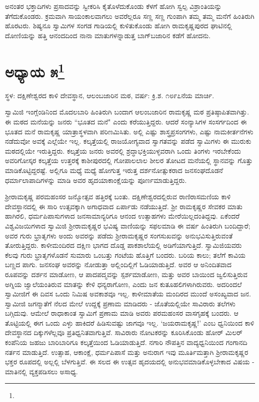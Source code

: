 ಅನಂತರ ಭಕ್ತಾದಿಗಳು ಪ್ರಸಾದವನ್ನು ಸ್ವೀಕರಿಸಿ ಕೈತೊಳೆದುಕೊಂಡು ಕೆಳಗೆ ಹೋಗಿ ಸ್ವಲ್ಪ ವಿಶ್ರಾಂತಿಯನ್ನು ತೆಗೆದುಕೊಂಡರು. ಕ್ರಮವಾಗಿ ಸಾಯಂಕಾಲವಾಗಲು ಅವರೆಲ್ಲರೂ ಸಣ್ಣ ಸಣ್ಣ ಗುಂಪಾಗಿ ತಮ್ಮ ತಮ್ಮ ಮನೆಗೆ ಹಿಂತಿರುಗಿ ಹೊರಟರು. ಶಿಷ್ಯನೂ ಸ್ವಾಮಿಗಳ ಸಂಗಡ ಗಾಡಿಯಲ್ಲಿ ಕುಳಿತುಕೊಂಡು ಹೋಗಿ ರಾಮಕೃಷ್ಣಪುರದ ಘಾಟಿನಲ್ಲಿ ದೋಣಿಯನ್ನು ಹತ್ತಿ ಆನಂದದಿಂದ ನಾನಾ ಮಾತುಗಳನ್ನಾಡುತ್ತ ಬಾಗ್‌ಬಜಾರಿನ ಕಡೆಗೆ ಹೋದನು.

\newpage

\chapter[ಅಧ್ಯಾಯ ೫]{ಅಧ್ಯಾಯ ೫\protect\footnote{}}

\centerline{ಸ್ಥಳ: ದಕ್ಷಿಣೇಶ್ವರದ ಕಾಳಿ ದೇವಸ್ಥಾನ, ಆಲಂಬಜಾರಿನ ಮಠ, ವರ್ಷ: ಕ್ರಿ.ಶ. ೧೮೯೭ನೆಯ ಮಾರ್ಚಿ.}

ಸ್ವಾಮಿಜಿ ಇಂಗ್ಲೆಂಡಿನಿಂದ ಮೊದಲಬಾರಿ ಹಿಂತಿರುಗಿ ಬಂದಾಗ ಆಲಂಬಜಾರಿನ ರಾಮಕೃಷ್ಣ ಮಠ ಪ್ರತಿಷ್ಠಾಪಿತವಾಗಿತ್ತು. ಈ ಮಠದ ಮನೆಯನ್ನು ಜನರು “ಭೂತದ ಮನೆ" ಎಂದು ಕರೆಯುತ್ತಿದ್ದರು. ಆದರೆ ಸಂನ್ಯಾಸಿಗಳ ಸಂಸರ್ಗದಿಂದ ಈ ಭೂತದ ಮನೆ ರಾಮಕೃಷ್ಣ ಯಾತ್ರಾಸ್ಥಳವಾಗಿ ಪರಿಣಮಿಸಿತು. ಅಲ್ಲಿ ಎಷ್ಟು ಶಾಸ್ತ್ರಪ್ರಸಂಗಗಳು, ಎಷ್ಟು ನಾಮಕೀರ್ತನೆಗಳು ನಡೆದುವೋ ಅವಕ್ಕೆ ಎಲ್ಲೆಯೇ ಇಲ್ಲ. ಕಲ್ಕತ್ತೆಯಲ್ಲಿ ರಾಜಯೋಗ್ಯವಾದ ಸ್ವಾಗತವನ್ನು ಪಡೆದ ಸ್ವಾಮಿಗಳು ಈ ಮುರುಕು ಮಠದಲ್ಲಿಯೇ ಇರುತ್ತಿದ್ದರು. ಕಲ್ಕತ್ತೆಯ ಜನರು ಅವರಲ್ಲಿ ಶ್ರದ್ಧಾಭಕ್ತಿಯುಳ್ಳವರಾಗಿ ಒಂದು ತಿಂಗಳು ಇರಬೇಕೆಂದು ಅವರಿಗೋಸ್ಕರ ಕಲ್ಕತ್ತೆಯ ಉತ್ತರಕ್ಕೆ ಕಾಶೀಪುರದಲ್ಲಿ ಗೋಪಾಲಲಾಲ ಶೀಲರ ತೋಟದ ಮನೆಯಲ್ಲಿ ಸ್ಥಾನವನ್ನು ಗೊತ್ತು ಮಾಡಿಕೊಟ್ಟಿದ್ದರಷ್ಟೆ. ಅಲ್ಲಿಗೂ ಮಧ್ಯೆ ಮಧ್ಯೆ ಹೋಗುತ್ತ ಇರುತ್ತ ದರ್ಶನೋತ್ಸುಕರಾದ ಜನಸಂಘದೊಡನೆ ಧರ್ಮಾಲಾಪಾದಿಗಳನ್ನು ಮಾಡಿ ಅವರ ಹೃದಯಾಕಾಂಕ್ಷೆಯನ್ನು ಪೂರ್ಣಮಾಡುತ್ತಿದ್ದರು.

ಶ‍್ರೀರಾಮಕೃಷ್ಣ ಪರಮಹಂಸರ ಜನ್ಮೋತ್ಸವ ಹತ್ತಿರಕ್ಕೆ ಬಂತು. ದಕ್ಷಿಣೇಶ್ವರದಲ್ಲಿರುವ ರಾಣಿರಾಸಮಣಿಯ ಕಾಳಿ ದೇವಸ್ಥಾನದಲ್ಲಿ ಈ ಸಾರಿ ಉತ್ಸವಕ್ಕಾಗಿ ಅಗಾಧವಾದ ಏರ್ಪಾಡು ನಡೆಯುತ್ತಿದೆ. ಶ‍್ರೀ ರಾಮಕೃಷ್ಣರ ಸೇವಕರ ಮಾತು ಹಾಗಿರಲಿ, ಧರ್ಮಪಿಪಾಸುಗಳಾದ ಜನಸಾಮಾನ್ಯರಿಗೂ ಆನಂದ ಉತ್ಸಾಹಗಳು ಮೇರೆಯಿಲ್ಲದಂತಿದ್ದವು. ಏಕೆಂದರೆ ವಿಶ್ವವಿಜಯಿಗಳಾದ ಸ್ವಾಮಿಜಿ ಶ‍್ರೀರಾಮಕೃಷ್ಣರ ಭವಿಷ್ಯ ವಾಣಿಯನ್ನು ಸಫಲಮಾಡಿ ಈ ವರ್ಷ ಹಿಂತಿರುಗಿ ಬಂದಿದ್ದಾರೆ; ಅವರ ಗುರು ಭ್ರಾತೃಗಳು ಅಂದು ಅವರನ್ನು ಪಡೆದು ಶ‍್ರೀರಾಮಕೃಷ್ಣರ ಸಂಗಸುಖವನ್ನು ಅನುಭವಿಸುತ್ತಿರುವಂತೆ ತೋರುತ್ತಿದ್ದರು. ಕಾಳೀಮಂದಿರದ ದಕ್ಷಿಣ ಭಾಗದ ದೊಡ್ಡ ಪಾಕಶಾಲೆಯಲ್ಲಿ ಅಡಿಗೆಯಾಗುತ್ತಿದೆ. ಸ್ವಾಮಿಜಿಯವರು ಕೆಲವು ಗುರು ಭ್ರಾತೃಗಳೊಡನೆ ಸುಮಾರು ಒಂಬತ್ತು ಗಂಟೆಯ ಹೊತ್ತಿಗೆ ಬಂದರು. ಬರಿಯ ಕಾಲು; ತಲೆಗೆ ಕಾವಿಯ ಬಣ್ಣದ ಪಾಗು. ಜನಸಂಘ ಅವರನ್ನು ನೋಡುತ್ತಾ ಅಲ್ಲಿಂದಿಲ್ಲಿಗೆ ಓಡಿಯಾಡುತ್ತಿದೆ. ಅವರ ಆ ಅನಿಂದಿತವಾದ ರೂಪವನ್ನು ದರ್ಶನ ಮಾಡೋಣ, ಆ ಪಾದಪದ್ಮವನ್ನು ಸ್ಪರ್ಶಮಾಡೋಣ, ಮತ್ತು ಅವರ ಬಾಯಿಂದ ಜ್ವಲಿಸುತ್ತಿರುವ ಅಗ್ನಿಯ ಜ್ವಾಲೆಯಂತಿರುವ ಮಾತನ್ನು ಕೇಳಿ ಧನ್ಯರಾಗೋಣ, ಎಂದು ಜನ ಕುತೂಹಲಿಗಳಾಗಿರುವರು. ಅದರಿಂದಲೆ ಸ್ವಾಮೀಜಿಗೆ ಈ ದಿವಸ ಒಂದು ನಿಮಿಷ ಅವಕಾಶವೂ ಇಲ್ಲ. ಕಾಳೀಮಾತೆಯ ಮಂದಿರದ ಮುಂದೆ ಅಸಂಖ್ಯವಾದ ಜನ. ಸ್ವಾಮೀಜಿ ಜಗನ್ಮಾತೆಗೆ ನೆಲದ ಮೇಲೆ ಉದ್ದಕ್ಕೆ ಪ್ರಣಾಮ ಮಾಡಿದರು - ಜೊತೆಯಲ್ಲಿಯೇ ಸಾವಿರಾರು ತಲೆಗಳು ಬಗ್ಗಿದುವು. ಆಮೇಲೆ ರಾಧಾಕಾಂತ ಸ್ವಾಮಿಗೆ ಪ್ರಣಾಮ ಮಾಡಿ ಅವರು ಪರಮಹಂಸರ ವಾಸಗೃಹಕ್ಕೆ ಬಂದರು. ಆ ತೊಟ್ಟಿಯಲ್ಲಿ ಈಗ ಒಂದು ಎಳ್ಳು ಹಾಕಿದರೆ ಹಿಡಿಸುವಷ್ಟು ಜಾಗವೂ ಇಲ್ಲ. ‘ಜಯರಾಮಕೃಷ್ಣ!’ ಎಂಬ ಧ್ವನಿಯಿಂದ ಕಾಳಿ ದೇವಸ್ಥಾನದ ದಿಕ್ಕುಗಳೆಲ್ಲವೂ ಪ್ರತಿಧ್ವನಿತವಾಗುತ್ತಿವೆ. ಸಾವಿರಾರು ನೋಟಕರನ್ನು ಕೂರಿಸಿಕೊಂಡು ಹೋರ್‌ ಮಿಲರ್ ಕಂಪೆನಿಯ ಜಹಜು ಬಾರಿಬಾರಿಗೂ ಕಲ್ಕತ್ತೆಯಿಂದ ಓಡಿಯಾಡುತ್ತಿದೆ. ನಗಾರಿ ನೌಪತ್ತಿನ ವಾದ್ಯಧ್ವನಿಯಿಂದ ಗಂಗಾನದಿ ನರ್ತನ ಮಾಡುತ್ತಿದೆ. ಉತ್ಸಾಹ, ಆಕಾಂಕ್ಷೆ, ಧರ್ಮಪಿಪಾಸೆ ಮತ್ತು ಅನುರಾಗ ಇವು ಮೂರ್ತಿಮತ್ತಾಗಿ ಶ‍್ರೀರಾಮಕೃಷ್ಣರ ಭಕ್ತರ ರೂಪದಲ್ಲಿ ಅಲ್ಲಲ್ಲಿ ಬೆಳಗುತ್ತಿವೆ. ಈ ಸಲದ ಈ ಉತ್ಸವ ಹೃದಯದಲ್ಲಿ ಅನುಭವಮಾಡಿಕೊಳ್ಳಬೇಕಾದ ವಿಷಯ - ಮಾತಿನಲ್ಲಿ ವ್ಯಕ್ತಪಡಿಸಲು ಅಸಾಧ್ಯ.

